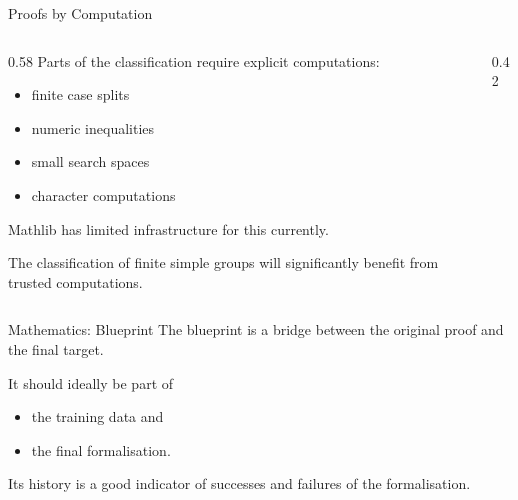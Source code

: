 \documentclass{beamer}
\begin{document}
\begin{frame}{Proofs by Computation}
\begin{columns}[T,totalwidth=\textwidth]
  \begin{column}{0.58\textwidth}
Parts of the classification require explicit computations:

\medskip

\begin{itemize}
  \item finite case splits
  \medskip
  \item numeric inequalities
  \medskip
  \item small search spaces
  \medskip
  \item character computations
\end{itemize}

\bigskip

Mathlib has limited infrastructure for this currently.

\bigskip

The classification of finite simple groups will significantly benefit from trusted computations.
  \end{column}
  \begin{column}{0.42\textwidth}
\begin{center}
\end{center}
  \end{column}
\end{columns}
\end{frame}

\begin{frame}{Mathematics: Blueprint}
The blueprint is a bridge between the original proof and the final target.

\bigskip

It should ideally be part of

\medskip

\begin{itemize}
  \item the training data and
  \smallskip
  \item the final formalisation.
\end{itemize}

\bigskip

Its history is a good indicator of successes and failures of the formalisation.
\end{frame}
\end{document}
